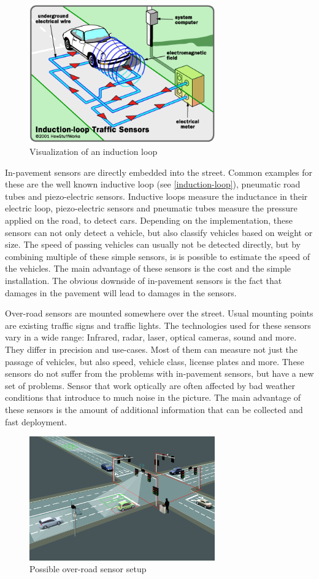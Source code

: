 \begin{figure}[ht]
	\centering
	\includegraphics[width=8cm]{figures/induction-loop}
	\caption{Visualization of an induction loop}
	\label{induction-loop}
\end{figure}

In-pavement sensors are directly embedded into the street. Common examples for these are the well known inductive loop (see \autoref{induction-loop}), pneumatic road tubes and piezo-electric sensors. Inductive loops measure the inductance in their electric loop, piezo-electric sensors and pneumatic tubes measure the pressure applied on the road, to detect cars. Depending on the implementation, these sensors can not only detect a vehicle, but also classify vehicles based on weight or size. The speed of passing vehicles can usually not be detected directly, but by combining multiple of these simple sensors, is is possible to estimate the speed of the vehicles.
The main advantage of these sensors is the cost and the simple installation. The obvious downside of in-pavement sensors is the fact that damages in the pavement will lead to damages in the sensors.

Over-road sensors are mounted somewhere over the street. Usual mounting points are existing traffic signs and traffic lights. The technologies used for these sensors vary in a wide range: Infrared, radar, laser, optical cameras, sound and more. They differ in precision and use-cases. Most of them can measure not just the passage of vehicles, but also speed, vehicle class, license plates and more. These sensors do not suffer from the problems with in-pavement sensors, but have a new set of problems. Sensor that work optically are often affected by bad weather conditions that introduce to much noise in the picture. The main advantage of these sensors is the amount of additional information that can be collected and fast deployment.

\begin{figure}[ht]
	\centering
	\includegraphics[width=8cm]{figures/overroad-sensor}
	\caption{Possible over-road sensor setup}
	\label{overroad-sensor}
\end{figure}

